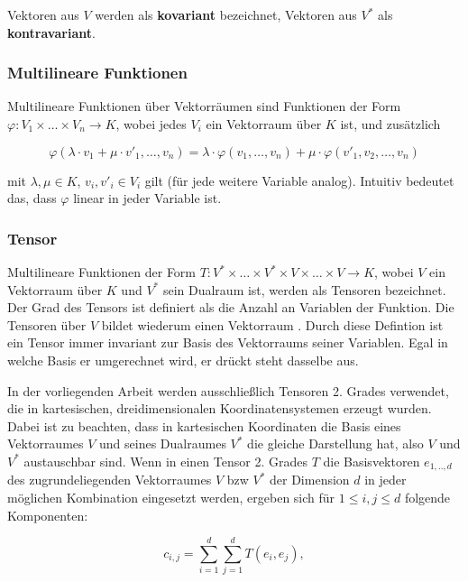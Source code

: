 \documentclass[a4paper,fontsize=12pt,toc=bib,halfparskip]{scrartcl}
\begin{document}
Vektoren aus $V$ werden als \textbf{kovariant} bezeichnet, Vektoren aus $V^*$ als \textbf{kontravariant}\cite[S.~205]{bowen2008introduction}.

\subsubsection{Multilineare Funktionen}
Multilineare Funktionen \"uber Vektorr\"aumen sind Funktionen der Form $\varphi: V_1 \times \dots \times V_n \rightarrow K$, wobei jedes $V_i$ ein Vektorraum \"uber $K$ ist, und zus\"atzlich 

\begin{equation}
	\varphi(\lambda \cdot v_1 + \mu \cdot v'_1, \dots, v_n) = \lambda \cdot \varphi(v_1, \dots, v_n) + \mu \cdot \varphi(v'_1, v_2, \dots, v_n)
\end{equation}

mit $\lambda, \mu \in K$, $v_i, v'_i \in V_i$ gilt (f\"ur jede weitere Variable analog). Intuitiv bedeutet das, dass $\varphi$ linear in jeder Variable ist\cite[S.~204, 218]{bowen2008introduction}.

\subsubsection{Tensor}
Multilineare Funktionen der Form $T: V^*\times\dots\times V^*\times V \times \dots \times V \rightarrow K$, wobei $V$ ein Vektorraum \"uber $K$ und $V^*$ sein Dualraum ist, werden als Tensoren bezeichnet\cite[S.~218]{bowen2008introduction}. Der Grad des Tensors ist definiert als die Anzahl an Variablen der Funktion. Die Tensoren \"uber $V$ bildet wiederum einen Vektorraum \cite[S.~220]{bowen2008introduction}. Durch diese Defintion ist ein Tensor immer invariant zur Basis des Vektorraums seiner Variablen. Egal in welche Basis er umgerechnet wird, er dr\"uckt steht dasselbe aus.

In der vorliegenden Arbeit werden ausschlie{\ss}lich Tensoren 2. Grades verwendet, die in kartesischen, dreidimensionalen Koordinatensystemen erzeugt wurden. Dabei ist zu beachten, dass in kartesischen Koordinaten die Basis eines Vektorraumes $V$ und seines Dualraumes $V^*$ die gleiche Darstellung hat, also $V$ und $V^*$ austauschbar sind. Wenn in einen Tensor 2. Grades $T$ die Basisvektoren $e_{1,..,d}$ des zugrundeliegenden Vektorraumes $V$ bzw $V^*$ der Dimension $d$ in jeder m\"oglichen Kombination eingesetzt werden, ergeben sich f\"ur $1\leq i,j\leq d$ folgende Komponenten:

\begin{equation}
	c_{i,j} = \sum_{i=1}^{d} \sum_{j=1}^{d} T(e_i, e_j),  
\end{equation}
\end{document}
